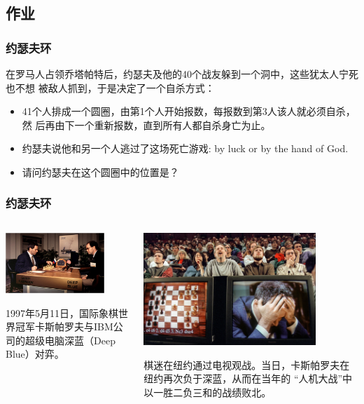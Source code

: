 \subsection{作业}
\begin{frame}[fragile]
  \frametitle{约瑟夫环}

  在罗马人占领乔塔帕特后，约瑟夫及他的40个战友躲到一个洞中，这些犹太人宁死也不想
  被敌人抓到，于是决定了一个自杀方式：

  \begin{itemize}
    \item 41个人排成一个圆圈，由第1个人开始报数，每报数到第3人该人就必须自杀，然
      后再由下一个重新报数，直到所有人都自杀身亡为止。
  \item 约瑟夫说他和另一个人逃过了这场死亡游戏: by luck or by the hand of God.
  \item 请问约瑟夫在这个圆圈中的位置是？
  \end{itemize}
\end{frame}

\begin{frame}[fragile]
  \frametitle{约瑟夫环}

  \begin{columns}
    \begin{column}[T]{.5\linewidth}
      \includegraphics[width=0.8\textwidth]{figs/intro/deep_blue_1.png}

        1997年5月11日，国际象棋世界冠军卡斯帕罗夫与IBM公司的超级电脑深蓝（Deep Blue）对弈。
    \end{column}
    \begin{column}[T]{.5\linewidth}
      \includegraphics[width=0.8\textwidth]{figs/intro/deep_blue_2.png}

      棋迷在纽约通过电视观战。当日，卡斯帕罗夫在纽约再次负于深蓝，从而在当年的
      “人机大战”中以一胜二负三和的战绩败北。
    \end{column}
  \end{columns}
\end{frame}
